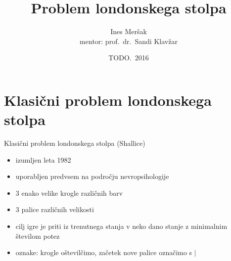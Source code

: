 \documentclass[dvipsnames]{beamer}
\title{Problem londonskega stolpa}
\author[Ines Meršak]{Ines Meršak \\[5px] mentor: prof.~dr.~Sandi Klavžar}
\date{TODO.~2016}
\begin{document}
    
\begin{frame}[plain]
    \titlepage
\end{frame}


\section{Klasični problem londonskega stolpa}
\begin{frame}{Klasični problem londonskega stolpa (Shallice)}
    \begin{itemize}
        \item izumljen leta 1982
        \item uporabljen predvsem na področju nevropsihologije
        \item 3 enako velike krogle različnih barv
        \item 3 palice različnih velikosti
        \item cilj igre je priti iz trenutnega stanja v neko dano stanje z minimalnim številom potez
        \item oznake: krogle oštevilčimo, začetek nove palice označimo s $|$
    \end{itemize}
\end{frame}
\end{document}
